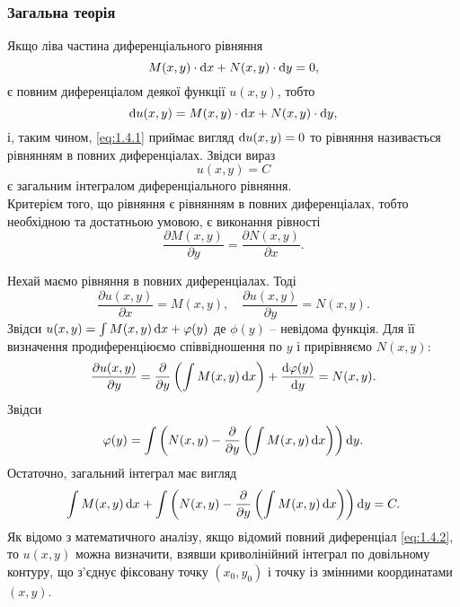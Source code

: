 \subsubsection{Загальна теорія}
Якщо ліва частина диференціального рівняння
\begin{equation}
	\label{eq:1.4.1}
	M(x, y) \cdot \mathop{}\!\mathrm{d} x + N(x, y) \cdot \mathop{}\!\mathrm{d} y = 0,
\end{equation}
є повним диференціалом деякої функції $u(x, y)$, тобто
\begin{equation}
	\label{eq:1.4.2}
	\mathop{}\!\mathrm{d} u(x, y) = M(x, y) \cdot \mathop{}\!\mathrm{d} x + N(x, y) \cdot \mathop{}\!\mathrm{d} y,
\end{equation}
і, таким чином, \eqref{eq:1.4.1} приймає вигляд $\mathop{}\!\mathrm{d} u (x, y) = 0$ то рівняння називається рівнянням в повних диференціалах. Звідси вираз
\begin{equation}
	\label{eq:1.4.3}
	u(x, y) = C
\end{equation}
є загальним інтегралом диференціального рівняння. \\

Критерієм того, що рівняння є рівнянням в повних диференціалах, тобто необхідною та достатньою умовою, є виконання рівності
\begin{equation}
	\label{eq:1.4.4}
	\frac{\partial M(x, y)}{\partial y} = \frac{\partial N(x, y)}{\partial x}.
\end{equation}
 
Нехай маємо рівняння в повних диференціалах. Тоді
\begin{equation}
	\label{eq:1.4.5}
	\frac{\partial u(x, y)}{\partial x} = M(x, y), \quad \frac{\partial u(x, y)}{\partial y} = N(x, y).
\end{equation}
Звідси $u(x, y) = \int M(x, y) \mathop{}\!\mathrm{d} x + \varphi(y)$ де $\phi(y)$ -- невідома функція. Для її визначення продиференціюємо співвідношення по $y$ і прирівняємо $N(x, y)$:
\begin{equation}
	\label{eq:1.4.6}
	\frac{\partial u(x, y)}{\partial y} = \frac{\partial}{\partial y} \left( \int M(x, y) \mathop{}\!\mathrm{d} x \right) + \frac{\mathop{}\!\mathrm{d} \varphi(y)}{\mathop{}\!\mathrm{d} y} = N(x, y).
\end{equation}
Звідси
\begin{equation}
	\label{eq:1.4.7}
	\varphi(y) = \int \left( N(x, y) - \frac{\partial}{\partial y} \left( \int M(x, y) \mathop{}\!\mathrm{d} x \right) \right) \mathop{}\!\mathrm{d} y.
\end{equation}
Остаточно, загальний інтеграл має вигляд
\begin{equation}
	\label{eq:1.4.8}
	\int M(x, y) \mathop{}\!\mathrm{d} x + \int \left( N(x, y) - \frac{\partial}{\partial y} \left( \int M(x, y) \mathop{}\!\mathrm{d} x \right) \right) \mathop{}\!\mathrm{d} y = C.
\end{equation}
Як відомо з математичного аналізу, якщо відомий повний диференціал \eqref{eq:1.4.2}, то $u(x, y)$ можна визначити, взявши криволінійний інтеграл по довільному контуру, що з’єднує фіксовану точку $(x_0, y_0)$ і точку із змінними координатами $(x, y)$. \\

